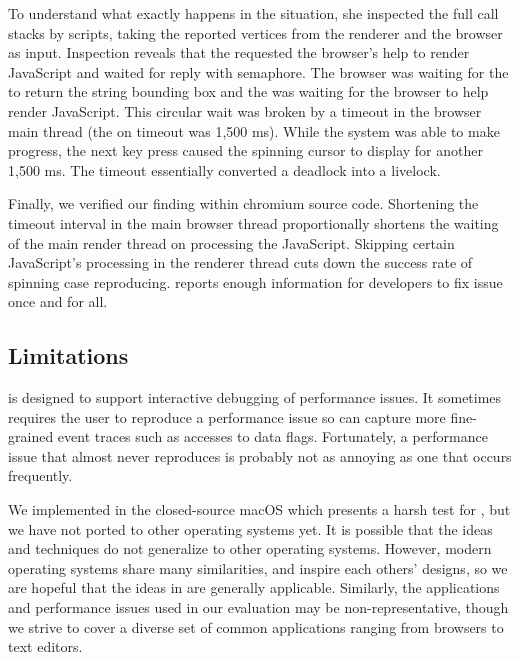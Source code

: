 To understand what exactly happens in the situation, she inspected the full
call stacks by \xxx scripts, taking the reported vertices from the renderer and
the browser as input. Inspection reveals that the  requested the
browser's help to render JavaScript and waited for reply with semaphore. The
browser was waiting for the  to return the string bounding box and
the  was waiting for the browser to help render JavaScript. This
circular wait was broken by a timeout in the browser main thread (the 
on  timeout was 1,500 ms). While the system was able to make progress, the
next key press caused the spinning cursor to display for another 1,500 ms. The
timeout essentially converted a deadlock into a livelock.

Finally, we verified our finding within chromium source code. Shortening the
timeout interval in the main browser thread proportionally shortens the waiting
of the main render thread on processing the JavaScript. Skipping certain
JavaScript's processing in the renderer thread cuts down the success rate of
spinning case reproducing. \xxx reports enough information for developers to fix
issue once and for all.

\subsection{Limitations}

\xxx is designed to support interactive debugging of performance issues. It
sometimes requires the user to reproduce a performance issue so \xxx can capture
more fine-grained event traces such as accesses to data flags. Fortunately, a
performance issue that almost never reproduces is probably not as annoying as
one that occurs frequently.

We implemented \xxx in the closed-source macOS which presents a harsh test
for \xxx, but we have not ported \xxx to other operating systems yet. It is
possible that the ideas and techniques do not generalize to other operating
systems. However, modern operating systems share many similarities, and inspire
each others' designs, so we are hopeful that the ideas in \xxx are generally
applicable. Similarly, the applications and performance issues used in our
evaluation may be non-representative, though we strive to cover a diverse set of
common applications ranging from browsers to text editors.
